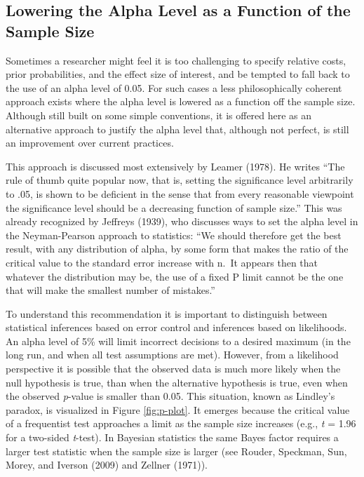 \documentclass[,jou,floatsintext]{apa6}
\begin{document}
\hypertarget{lowering-the-alpha-level-as-a-function-of-the-sample-size}{%
\subsection{Lowering the Alpha Level as a Function of the Sample Size}\label{lowering-the-alpha-level-as-a-function-of-the-sample-size}}

Sometimes a researcher might feel it is too challenging to specify relative costs, prior probabilities, and the effect size of interest, and be tempted to fall back to the use of an alpha level of 0.05. For such cases a less philosophically coherent approach exists where the alpha level is lowered as a function off the sample size. Although still built on some simple conventions, it is offered here as an alternative approach to justify the alpha level that, although not perfect, is still an improvement over current practices.

This approach is discussed most extensively by Leamer (1978). He writes \enquote{The rule of thumb quite popular now, that is, setting the significance level arbitrarily to .05, is shown to be deficient in the sense that from every reasonable viewpoint the significance level should be a decreasing function of sample size.} This was already recognized by Jeffreys (1939), who discusses ways to set the alpha level in the Neyman-Pearson approach to statistics: \enquote{We should therefore get the best result, with any distribution of alpha, by some form that makes the ratio of the critical value to the standard error increase with n.~It appears then that whatever the distribution may be, the use of a fixed P limit cannot be the one that will make the smallest number of mistakes.}

To understand this recommendation it is important to distinguish between statistical inferences based on error control and inferences based on likelihoods. An alpha level of 5\% will limit incorrect decisions to a desired maximum (in the long run, and when all test assumptions are met). However, from a likelihood perspective it is possible that the observed data is much more likely when the null hypothesis is true, than when the alternative hypothesis is true, even when the observed \emph{p}-value is smaller than 0.05. This situation, known as Lindley's paradox, is visualized in Figure \ref{fig:p-plot}. It emerges because the critical value of a frequentist test approaches a limit as the sample size increases (e.g., \emph{t} = 1.96 for a two-sided \emph{t}-test). In Bayesian statistics the same Bayes factor requires a larger test statistic when the sample size is larger (see Rouder, Speckman, Sun, Morey, and Iverson (2009) and Zellner (1971)).
\end{document}
